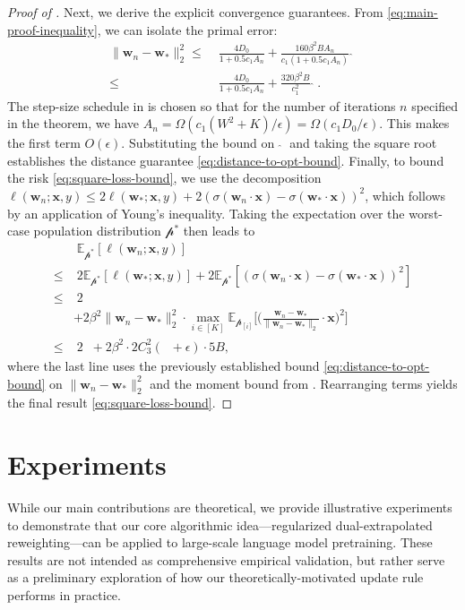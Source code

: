 \documentclass[11pt]{article}
\newcounter{thm}
\numberwithin{thm}{section}
\theoremstyle{plain}
\theoremstyle{definition}
\theoremstyle{remark} \newtheorem{remark}[thm]{Remark}
\def\vw{{\bm{w}}}
\def\vx{{\bm{x}}}
\def\pp{{\mathcal{p}}}
\newcommand{\E}{\mathbb{E}}
\newcommand{\ppi}{{\pp_{[i]}}}
\DeclareMathOperator{\mOPT}{OPT_m}
\newcommand{\mOPThat}{\widehat{\mOPT}}
\begin{document}
\begin{proof}[Proof of ]
Next, we derive the explicit convergence guarantees. From \eqref{eq:main-proof-inequality}, we can isolate the primal error:
\begin{align*}
\|\vw_n-\vw_*\|_2^2 \le \; & \frac{4D_0}{1+0.5c_1A_n} + \frac{160\beta^2B A_n}{c_1(1+0.5c_1A_n)}\mOPThat \\
\le \; & \frac{4D_0}{1+0.5c_1A_n} + \frac{320\beta^2B}{c_1^2}\mOPThat.
\end{align*}
The step-size schedule in  is chosen so that for the number of iterations $n$ specified in the theorem, we have $A_n = \Omega(c_1(W^2+K)/\epsilon) = \Omega(c_1 D_0 / \epsilon)$. This makes the first term $O(\epsilon)$. Substituting the bound on $\mOPThat$ and taking the square root establishes the distance guarantee \eqref{eq:distance-to-opt-bound}.
Finally, to bound the risk \eqref{eq:square-loss-bound}, we use the decomposition $\ell(\vw_n;\vx,y) \le 2\ell(\vw_*;\vx,y) + 2(\sigma(\vw_n\cdot\vx)-\sigma(\vw_*\cdot\vx))^2$, which follows by an application of Young's inequality. Taking the expectation over the worst-case population distribution $\pp^*$ then leads to
\begin{align*}
&\; \E_{\pp^*}[\ell(\vw_n;\vx,y)] \\
\le&\;  2\E_{\pp^*}[\ell(\vw_*;\vx,y)] + 2\E_{\pp^*}[(\sigma(\vw_n\cdot\vx)-\sigma(\vw_*\cdot\vx))^2] \\
\le&\; 2\mOPT \\ 
&+ 2\beta^2 \|\vw_n-\vw_*\|_2^2 \cdot \max_{i \in [K]} \E_{\ppi}\Big[\Big(\frac{\vw_n-\vw_*}{\|\vw_n-\vw_*\|_2} \cdot \vx\Big)^2\Big] \\
\le&\; 2\mOPT + 2\beta^2\cdot 2C_3^2(\mOPT+\epsilon) \cdot 5B,
\end{align*}
where the last line uses the previously established bound \eqref{eq:distance-to-opt-bound} on $\|\vw_n-\vw_*\|_2^2$ and the moment bound from . Rearranging terms yields the final result \eqref{eq:square-loss-bound}.
\end{proof}

\section{Experiments}\label{sec:experiments} 

While our main contributions are theoretical, we provide illustrative experiments to demonstrate that our core algorithmic idea—regularized dual-extrapolated reweighting—can be applied to large-scale language model pretraining. These results are not intended as comprehensive empirical validation, but rather serve as a preliminary exploration of how our theoretically-motivated update rule performs in practice.
\end{document}
